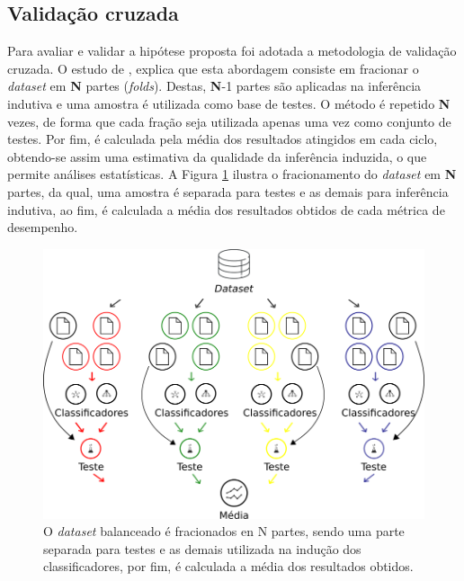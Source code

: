 \subsection{Validação cruzada}
\label{subsection:validacao_cruzada}

Para avaliar e validar a hipótese proposta foi adotada a metodologia de 
validação cruzada. O estudo de , explica que esta 
abordagem consiste em fracionar o \textit{dataset} em \textbf{N} partes 
(\textit{folds}). Destas, \textbf{N}-1 partes são aplicadas na inferência 
indutiva e uma amostra é utilizada como base de testes. O método é repetido 
\textbf{N} vezes, de forma que cada fração seja utilizada apenas uma vez como 
conjunto de testes. Por fim, é calculada pela média dos resultados atingidos em 
cada ciclo, obtendo-se assim uma estimativa da qualidade da inferência 
induzida, o que permite análises estatísticas. A Figura 
\ref{figure:metodologia_4} ilustra o fracionamento do \textit{dataset} em 
\textbf{N} partes, da qual, uma amostra é separada para testes e as demais para 
inferência indutiva, ao fim, é calculada a média dos resultados obtidos de cada 
métrica de desempenho. 

\begin{figure}[H]
\begin{center}
    \includegraphics[scale=0.50]{images/metodologia_4.png}
\end{center}
\caption{O \textit{dataset} balanceado é fracionados en N partes, sendo uma 
parte separada para testes e as demais utilizada na indução dos classificadores, 
por fim, é calculada a média dos resultados obtidos.}
\label{figure:metodologia_4}
\end{figure}